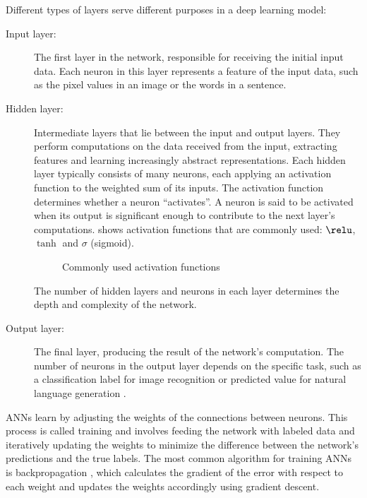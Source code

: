 Different types of layers serve different purposes in a deep learning model:
\begin{description}
    \item[Input layer:] 
    The first layer in the network, responsible for receiving the initial input data.
    Each neuron in this layer represents a feature of the input data, such as the pixel values in an image or the words in a sentence.
    \item[Hidden layer:] 
    Intermediate layers that lie between the input and output layers.
    They perform computations on the data received from the input, extracting features and learning increasingly abstract representations.
    Each hidden layer typically consists of many neurons, each applying an activation function to the weighted sum of its inputs.
    The activation function determines whether a neuron ``activates''.
    A neuron is said to be activated when its output is significant enough to contribute to the next layer's computations.
     shows activation functions that are commonly used: $\relu$, $\tanh$ and $\sigma$ (sigmoid).

    \begin{figure}[hbtp]
        \centering    
        
        \caption{Commonly used activation functions}
        \label{fig:activation_functions}
    \end{figure} 

    The number of hidden layers and neurons in each layer determines the depth and complexity of the network.
    \item[Output layer:] 
    The final layer, producing the result of the network's computation.
    The number of neurons in the output layer depends on the specific task, such as a classification label for image recognition or predicted value for natural language generation \cite{goodfellowDeepLearning2016}.
\end{description}

ANNs learn by adjusting the weights of the connections between neurons.
This process is called training and involves feeding the network with labeled data and iteratively updating the weights to minimize the difference between the network's predictions and the true labels.
The most common algorithm for training ANNs is backpropagation \cite{rumelhartLearningRepresentationsBackpropagating1986}, which calculates the gradient of the error with respect to each weight and updates the weights accordingly using gradient descent.

